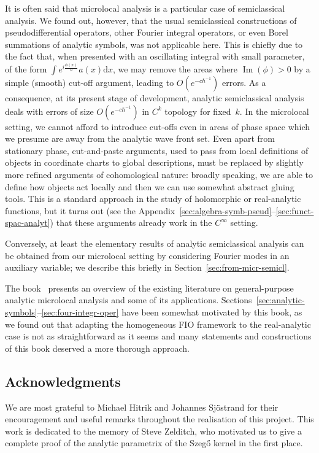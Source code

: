 \documentclass[10pt]{amsart}
\theoremstyle{definition}\newtheorem{defi}[theo]{Definition}\newtheorem{rema}[theo]{Remark}\newtheorem{exam}[theo]{Example}\newtheorem{exem}[theo]{Example}\newtheorem{nota}[theo]{Notation}
\DeclareMathOperator{\im}{Im}
\newcommand\1{\mathds{1}}
\newcommand{\dd}{\mathrm{d}}
\begin{document}
It is often said that microlocal analysis is a particular case of semiclassical analysis. We found out, however, that the usual semiclassical constructions of pseudodifferential operators, other Fourier integral operators, or even Borel summations of analytic symbols, was not applicable here. This is chiefly due to the fact that, when presented with an oscillating integral with small parameter, of the form $\int e^{i\frac{\phi(x)}{\hbar}}a(x)\dd x$, we may remove the areas where $\im(\phi)>0$ by a simple (smooth) cut-off argument, leading to $O(e^{-c\hbar^{-1}})$ errors. As a consequence, at its present stage of development, analytic semiclassical analysis deals with errors of size $O(e^{-c\hbar^{-1}})$ in $C^{k}$ topology for fixed~$k$. In the microlocal setting, we cannot afford to introduce cut-offs even in areas of phase space which we presume are away from the analytic wave front set. Even apart from stationary phase, cut-and-paste arguments, used to pass from local definitions of objects in coordinate charts to global descriptions, must be replaced by slightly more refined arguments of cohomological nature: broadly speaking, we are able to define how objects act locally and then we can use somewhat abstract gluing tools. This is a standard approach in the study of holomorphic or real-analytic functions, but it turns out (see the Appendix~\ref{sec:algebra-symb-pseud}--\ref{sec:funct-spac-analyt}) that these arguments already work in the $C^{\infty}$ setting.

Conversely, at least the elementary results of analytic semiclassical analysis can be obtained from our microlocal setting by considering Fourier modes in an auxiliary variable; we describe this briefly in Section~\ref{sec:from-micr-semicl}.

The book~\cite{treves_analytic_2022} presents an overview of the existing literature on general-purpose analytic microlocal analysis and some of its applications. Sections~\ref{sec:analytic-symbols}--\ref{sec:four-integr-oper} have been somewhat motivated by this book, as we found out that adapting the homogeneous FIO framework to the real-analytic case is not as straightforward as it seems and many statements and constructions of this book deserved a more thorough approach.

\subsection*{Acknowledgments}

We are most grateful to Michael Hitrik and Johannes Sj\"ostrand for their encouragement and useful remarks throughout the realisation of this project.
This work is dedicated to the memory of Steve Zelditch, who motivated us to give a complete proof of the analytic parametrix of the Szeg\H{o} kernel in the first place.
\end{document}
